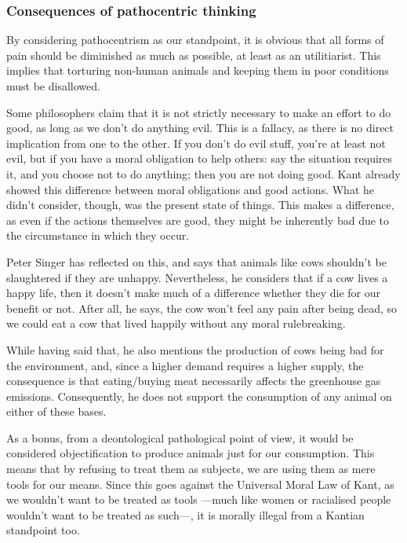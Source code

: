 \documentclass{myassignment}
\begin{document}
\begin{answer}
		\subsubsection*{Consequences of pathocentric thinking}%

		By considering pathocentrism as our standpoint, it is obvious that all forms of pain should be diminished as much as possible, at least as an utilitiarist. This implies that torturing non-human animals and keeping them in poor conditions must be disallowed. 

		Some philosophers claim that it is not strictly necessary to make an effort to do good, as long as we don't do anything evil. This is a fallacy, as there is no direct implication from one to the other. If you don't do evil stuff, you're at least not evil, but if you have a moral obligation to help others: say the situation requires it, and you choose not to do anything; then you are not doing good. Kant already showed this difference between moral obligations and good actions. What he didn't consider, though, was the present state of things. This makes a difference, as even if the actions themselves are good, they might be inherently bad due to the circumstance in which they occur.

		Peter Singer has reflected on this, and says that animals like cows shouldn't be slaughtered if they are unhappy. Nevertheless, he considers that if a cow lives a happy life, then it doesn't make much of a difference whether they die for our benefit or not. After all, he says, the cow won't feel any pain after being dead, so we could eat a cow that lived happily without any moral rulebreaking.

		While having said that, he also mentions the production of cows being bad for the environment, and, since a higher demand requires a higher supply, the consequence is that eating/buying meat necessarily affects the greenhouse gas emissions. Consequently, he does not support the consumption of any animal on either of these bases.

		As a bonus, from a deontological pathological point of view, it would be considered objectification to produce animals just for our consumption. This means that by refusing to treat them as subjects, we are using them as mere tools for our means. Since this goes against the Universal Moral Law of Kant, as we wouldn't want to be treated as tools ---much like women or racialised people wouldn't want to be treated as such---, it is morally illegal from a Kantian standpoint too.
 	\end{answer}
\end{document}
